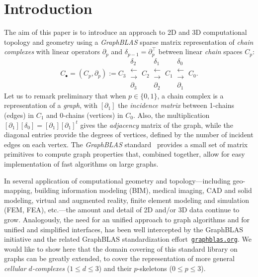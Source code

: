 \section{Introduction}\label{introduction}

The aim of this paper is to introduce an approach to 2D and 3D
computational topology and geometry using a \emph{GraphBLAS} sparse matrix
representation of \emph{chain complexes} with linear operators $\partial_p$ and $\delta_{p-1} = \partial_p^\top$ between linear \emph{chain} spaces $C_p$:
\[ 
C_\bullet = (C_p, \partial_p) := 
C_3 \ 
\substack{
\delta_2 \\
\longleftarrow \\[-1mm]
\longrightarrow \\
\partial_3 
}
\ C_2 \ 
\substack{
\delta_1 \\
\longleftarrow \\[-1mm]
\longrightarrow \\
\partial_2 
}
\ C_1 \ 
\substack{
\delta_0 \\
\longleftarrow \\[-1mm]
\longrightarrow \\
\partial_1 
}
\ C_0 .
\] 
Let us to remark preliminary that when $p\in \{0,1\}$, a chain complex is a representation of a \emph{graph}, with $[\partial_1]$ the \emph{incidence matrix} between 1-chains (edges) in $C_1$ and 0-chains (vertices) in $C_0$. Also, the multiplication $[\partial_1][\delta_0]=[\partial_1][\partial_1]^t$ gives the \emph{adjacency} matrix of the graph, while the diagonal entries provide the degrees of vertices, defined by the number of incident edges on each vertex. The \emph{GraphBLAS} standard~\cite{GraphBLAS:standard} provides a small set of matrix primitives to compute graph properties that, combined together, allow for easy implementation of fast algorithms on large graphs.

In several application of computational geometry and topology---including
geo-mapping, building information modeling (BIM), medical imaging, CAD and
solid modeling, virtual and augmented reality, finite element modeling
and simulation (FEM, FEA), etc.---the amount and detail of 2D and/or 3D data
continue to grow. Analogously, the need for an unified approach to
graph algorithms and for unified and simplified interfaces, has been
well intercepted by the GraphBLAS initiative and the related GraphBLAS
standardization effort~\href{http://graphblas.org}{\texttt{graphblas.org}}. We would like to show here that the domain
covering of this standard library on graphs can be greatly extended, to cover the
representation of more general \emph{cellular $d$-complexes} ($1\leq d\leq 3$) and their $p$-skeletons ($0\leq p\leq 3$).

